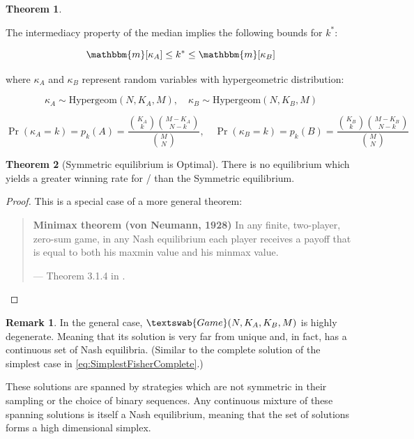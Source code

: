 \documentclass{article}
\theoremstyle{definition}
\newtheorem{theorem}{Theorem}[section]
\newtheorem*{remark}{Remark}
\newcommand{\G}[1]{$\textswab{Game}(#1)$}
\begin{document}
\begin{theorem}
\label{thm:FiniteKMedianBounds}

    The intermediacy property of the median implies the following bounds for $k^*$:

    \begin{equation}
        \mathbbm{m}[\kappa_A]
        \le
        k^*
        \le
        \mathbbm{m}[\kappa_B]
    \end{equation}

    where $\kappa_A$ and $\kappa_B$ represent random variables with hypergeometric distribution:

    \begin{equation}
        \kappa_A \sim \mathrm{Hypergeom}(N,K_A,M), \quad
        \kappa_B \sim \mathrm{Hypergeom}(N,K_B,M)
    \end{equation}

    \begin{equation}
    \Pr(\kappa_A = k) =
    p_k(A) = \frac{\binom{K_A}{k} \binom{M-K_A}{N-k}}{\binom{M}{N}}, \quad
    \Pr(\kappa_B = k) =
    p_k(B) = \frac{\binom{K_B}{k} \binom{M-K_B}{N-k}}{\binom{M}{N}}
\end{equation}

\end{theorem}



\begin{theorem}[Symmetric equilibrium is Optimal]

    There is no equilibrium which yields a greater winning rate for \PI/ than the Symmetric equilibrium.


\end{theorem}

\begin{proof}
    This is a special case of a more general theorem:

    \begin{quote}
    {\bf Minimax theorem (von Neumann, 1928)}
    In any finite, two-player, zero-sum game, in any Nash equilibrium each player receives a payoff that is equal to both his maxmin value and his minmax value.

    \hfill --- Theorem 3.1.4 in \cite{book:EssentialGameTheory}.
    \end{quote}

\end{proof}



\begin{remark}
In the general case, \G{N,K_A,K_B,M} is highly degenerate. Meaning that its solution is very far from unique and, in fact, has a continuous set of Nash equilibria. (Similar to the complete solution of the simplest case in \eqref{eq:SimplestFisherComplete}.)

These solutions are spanned by strategies which are not symmetric in their sampling or the choice of binary sequences.
Any continuous mixture of these spanning solutions is itself a Nash equilibrium, meaning that the set of solutions forms a high dimensional simplex.

\end{remark}
\end{document}
